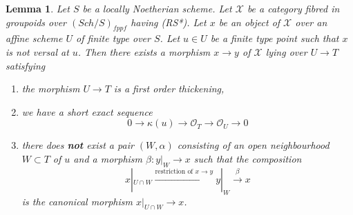 \documentclass{amsart}
\theoremstyle{plain}
\newtheorem{lemma}[subsection]{Lemma}
\theoremstyle{definition}
\theoremstyle{remark}
\numberwithin{equation}{subsection}
\def\Sch{\mathit{Sch}}
\begin{document}
\begin{lemma}
\label{lemma-single-point}
Let $S$ be a locally Noetherian scheme. Let $\mathcal{X}$ be a category
fibred in groupoids over $(\Sch/S)_{fppf}$ having (RS*).
Let $x$ be an object of $\mathcal{X}$ over an affine scheme $U$
of finite type over $S$. Let $u \in U$ be a finite type point such that
$x$ is not versal at $u$. Then there exists a morphism $x \to y$
of $\mathcal{X}$ lying over $U \to T$ satisfying
\begin{enumerate}
\item the morphism $U \to T$ is a first order thickening,
\item we have a short exact sequence
$$
0 \to \kappa(u) \to \mathcal{O}_T \to \mathcal{O}_U \to 0
$$
\item there does {\bf not} exist a pair $(W, \alpha)$
consisting of an open neighbourhood $W \subset T$ of $u$
and a morphism $\beta : y|_W \to x$ such that the composition
$$
x|_{U \cap W} \xrightarrow{\text{restriction of }x \to y}
y|_W \xrightarrow{\beta} x
$$
is the canonical morphism $x|_{U \cap W} \to x$.
\end{enumerate}
\end{lemma}
\end{document}
